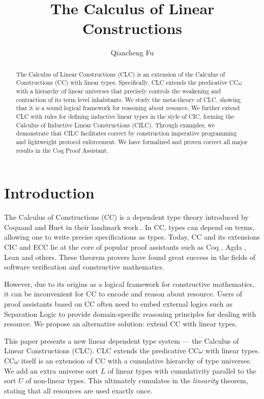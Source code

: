 \documentclass[sigplan,screen,review,anonymous]{acmart}
\title{The Calculus of Linear Constructions}
\author{Qiancheng Fu}
\affiliation{
  \institution{Boston University}
  \city{Boston}
  \state{MA}
  \country{USA}
}
\begin{document}
\begin{abstract}
  The Calculus of Linear Constructions (CLC) is an extension of the Calculus of Constructions (CC) with linear types. Specifically, CLC extends the predicative CC$\omega$ with a hierarchy of linear universes that precisely controls the weakening and contraction of its term level inhabitants. We study the meta-theory of CLC, showing that it is a sound logical framework for reasoning about resource. We further extend CLC with rules for defining inductive linear types in the style of CIC, forming the Calculus of Inductive Linear Constructions (CILC). Through examples, we demonstrate that CILC facilitates correct by construction imperative programming and lightweight protocol enforcement. We have formalized and proven correct all major results in the Coq Proof Assistant.
\end{abstract}
\maketitle

\section{Introduction}
The Calculus of Constructions (CC) is a dependent type theory introduced by Coquand and Huet in their landmark work \cite{cc}. In CC, types can depend on terms, allowing one to write precise specifications as types. Today, CC and its extensions CIC \cite{cic} and ECC \cite{ecc} lie at the core of popular proof assistants such as Coq \cite{coq}, Agda \cite{agda}, Lean \cite{lean} and others. These theorem provers have found great success in the fields of software verification and constructive mathematics.

However, due to its origins as a logical framework for constructive mathematics, it can be inconvenient for CC to encode and reason about resource. Users of proof assistants based on CC often need to embed external logics such as Separation Logic to provide domain-specific reasoning principles for dealing with resource. We propose an alternative solution: extend CC with linear types.

This paper presents a new linear dependent type system --- the Calculus of Linear Constructions (CLC). CLC extends the predicative CC$\omega$ with linear types. CC$\omega$ itself is an extension of CC with a cumulative hierarchy of type universes. We add an extra universe sort $L$ of linear types with cumulativity parallel to the sort $U$ of non-linear types. This ultimately cumulates in the \textit{linearity} theorem, stating that all resources are used exactly once.
\end{document}
